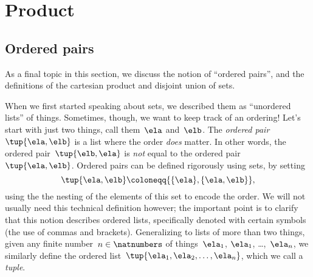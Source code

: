 \section{Product}

\subsection{Ordered pairs}\label{subsec:ordered-pairs}

As a final topic in this section, we discuss the notion of ``ordered pairs'', and the definitions of the cartesian product and disjoint union of sets.

When we first started speaking about sets, we described them as ``unordered lists'' of things.
Sometimes, though, we want to keep track of an ordering!
Let's start with just two things, call them~$\ela$ and~$\elb$.
The \emph{ordered pair}~$\tup{\ela,\elb}$ is a list where the order \emph{does} matter.
In other words, the ordered pair~$\tup{\elb,\ela}$ is \emph{not} equal to the ordered pair~$\tup{\ela,\elb}$.
Ordered pairs can be defined rigorously using sets, by setting
\begin{equation}
	\label{eq:ordered-pair}
	\tup{\ela, \elb} \coloneqq \{ \{\ela \} , \{ \ela, \elb \} \},
\end{equation}
using the the nesting of the elements of this set to encode the order.
We will not usually need this technical definition however;
the important point is to clarify that this notion describes ordered lists, specifically denoted with certain symbols (the use of commas and brackets).
Generalizing to lists of more than two things, given any finite number~$n \in \natnumbers$ of things~$\ela_1$, $\ela_1$, \dots,~$\ela_n$, we similarly define the ordered list~$\tup{\ela_1, \ela_2, \ldots , \ela_n}$, which we call a \emph{tuple}.

